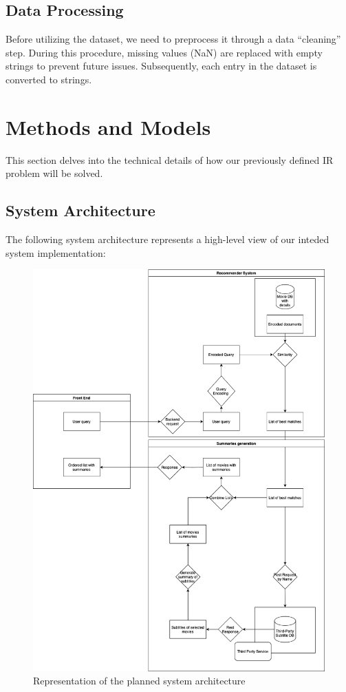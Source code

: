 \documentclass[12pt,a4paper]{article}
\begin{document}
  \subsection{Data Processing}

  Before utilizing the dataset, we need to preprocess it through a data ``cleaning'' step.
  During this procedure, missing values (NaN) are replaced with empty strings to prevent future issues.
  Subsequently, each entry in the dataset is converted to strings.

  \section{Methods and Models}

  This section delves into the technical details of how our previously defined IR problem will be solved.

  \subsection{System Architecture}

  The following system architecture represents a high-level view of our inteded system implementation:

  \begin{figure}[t]
    \includegraphics[scale=0.3]{"../assets/system_architecture"}
    \centering
    \caption{Representation of the planned system architecture}
  \end{figure}
\end{document}
